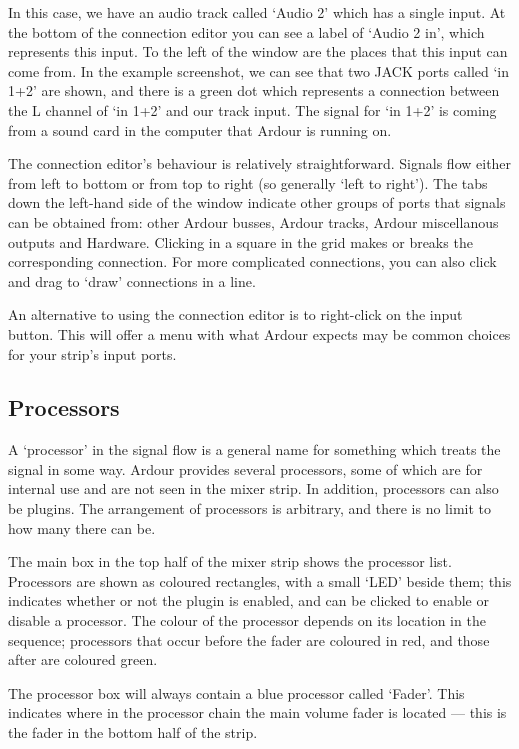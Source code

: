\documentclass[10pt,a4paper]{book}
\begin{document}
{In this case, we have an audio track called `Audio 2' which has a
single input.  At the bottom of the connection editor you can see a
label of `Audio 2 in', which represents this input.  To the left of
the window are the places that this input can come from.  In the
example screenshot, we can see that two JACK ports called `in 1+2' are
shown, and there is a green dot which represents a connection between
the L channel of `in 1+2' and our track input.  The signal for `in
1+2' is coming from a sound card in the computer that Ardour is
running on.

The connection editor's behaviour is relatively straightforward.
Signals flow either from left to bottom or from top to right (so
generally `left to right').  The tabs down the left-hand side of the
window indicate other groups of ports that signals can be obtained
from: other Ardour busses, Ardour tracks, Ardour miscellanous outputs
and Hardware.  Clicking in a square in the grid makes or breaks the
corresponding connection.  For more complicated connections, you can
also click and drag to `draw' connections in a line.

An alternative to using the connection editor is to right-click on the
input button.  This will offer a menu with what Ardour expects may be
common choices for your strip's input ports.

\subsection{Processors}

A `processor' in the signal flow is a general name for something which
treats the signal in some way.  Ardour provides several processors,
some of which are for internal use and are not seen in the mixer
strip.  In addition, processors can also be plugins.  The arrangement
of processors is arbitrary, and there is no limit to how many there
can be.

The main box in the top half of the mixer strip shows the processor
list.  Processors are shown as coloured rectangles, with a small `LED'
beside them; this indicates whether or not the plugin is enabled, and
can be clicked to enable or disable a processor.  The colour of the
processor depends on its location in the sequence; processors that
occur before the fader are coloured in red, and those after are
coloured green.

The processor box will always contain a blue processor called `Fader'.
This indicates where in the processor chain the main volume fader is
located --- this is the fader in the bottom half of the strip.

}
\end{document}
